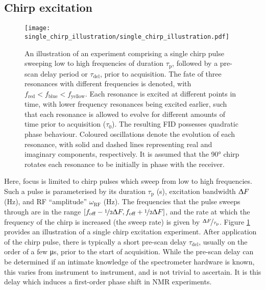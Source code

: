 \subsection{Chirp excitation}
\begin{figure}
    \centering
    \texttt{[image: single\_chirp\_illustration/single\_chirp\_illustration.pdf]}
    \caption[
        An illustration of an experiment comprising a single chirp pulse.
    ]
    {
        An illustration of an experiment comprising a single chirp pulse sweeping
        low to high frequencies of duration $\tau_{\text{p}}$, followed by
        a pre-scan delay period or $\tau_{\text{del}}$, prior to
        acquisition. The fate of three resonances with different frequencies is
        denoted, with $f_{\text{red}} < f_{\text{blue}} <
        f_{\text{yellow}}$. Each resonance is excited at different points
        in time, with lower frequency resonances being excited earlier, such that
        each resonance is allowed to evolve for different amounts of time prior
        to acquisition ($\tau_0$).
        The resulting \ac{FID} possesses quadratic phase behaviour.
        Coloured oscillations denote the evolution of each resonance, with
        solid and dashed lines representing real and imaginary components,
        respectively. It is assumed that the \ang{90} chirp rotates each
        resonance to be initially in phase with the receiver.
    }
    \label{fig:single-chirp}
\end{figure}
Here, focus is limited to chirp pulses which sweep from low to high
frequencies. Such a pulse is parameterised by
its duration $\tau_{\text{p}}$ (\unit{\second}),
excitation bandwidth $\Updelta F$ (\unit{\hertz}),
and \ac{RF} ``amplitude'' $\omega_{\text{RF}}$ (\unit{\hertz}).
The frequencies that the pulse sweeps through are in the range
$[f_{\text{off}} - \nicefrac{1}{2} \Updelta F,
f_{\text{off}} + \nicefrac{1}{2} \Updelta F]$,
and the rate at which the frequency of the chirp is increased (the sweep
rate) is given by $\nicefrac{\Updelta F}{\tau_{\text{p}}}$.
Figure \ref{fig:single-chirp} provides an illustration of a single chirp
excitation experiment. After application of the chirp pulse, there is typically
a short pre-scan delay $\tau_{\text{del}}$, usually on the order of a few
\unit{\micro\second}, prior to the start of acquisition. While the pre-scan
delay can be determined if an intimate knowledge of the spectrometer hardware
is known, this varies from instrument to instrument, and is not trivial to
ascertain. It is this delay which induces a first-order phase shift in \ac{NMR}
experiments.
